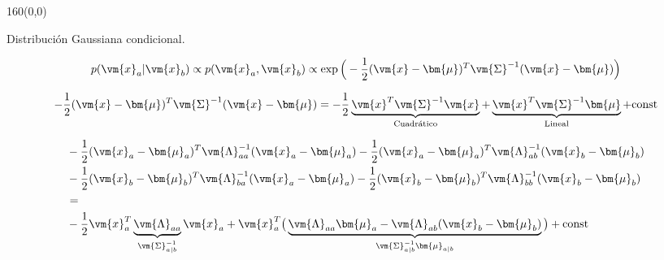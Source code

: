 \documentclass[shownotes,aspectratio=169]{beamer}
\begin{document}
\begin{frame}[plain]
 \begin{textblock}{160}(0,0)
\begin{center}
 \Large Distribuci\'on Gaussiana condicional.
\end{center}
\end{textblock}
\vspace{0.75cm}

\begin{align*}
 p(\vm{x}_a|\vm{x}_b) \propto p(\vm{x}_a,\vm{x}_b) \propto \exp\Big( -\frac{1}{2} (\vm{x}-\bm{\mu})^T \vm{\Sigma}^{-1} (\vm{x}-\bm{\mu}) \Big)
\end{align*}

\pause
\vspace{0.25cm}

\begin{align*}
-\frac{1}{2}(\vm{x}-\bm{\mu})^T \vm{\Sigma}^{-1} (\vm{x}-\bm{\mu}) = -\frac{1}{2} \underbrace{\vm{x}^T \vm{\Sigma}^{-1} \vm{x}}_{\text{Cuadr\'atico}} +  \underbrace{\vm{x}^T \vm{\Sigma}^{-1} \bm{\mu}}_{\text{Lineal}} + \text{const} 
\end{align*}

 
\pause
\vspace{0.25cm}

\begin{align*}
& -\frac{1}{2}(\vm{x}_a-\bm{\mu}_a)^T \vm{\Lambda}_{aa}^{-1} (\vm{x}_a-\bm{\mu}_a)
 -\frac{1}{2}(\vm{x}_a-\bm{\mu}_a)^T \vm{\Lambda}_{ab}^{-1} (\vm{x}_b-\bm{\mu}_b) \\
&  -\frac{1}{2}(\vm{x}_b-\bm{\mu}_b)^T \vm{\Lambda}_{ba}^{-1} (\vm{x}_a-\bm{\mu}_a)
-\frac{1}{2}(\vm{x}_b-\bm{\mu}_b)^T \vm{\Lambda}_{bb}^{-1} (\vm{x}_b-\bm{\mu}_b) \\
& = \\
& -\frac{1}{2} \vm{x}_a^T \underbrace{\vm{\Lambda}_{aa}}_{\vm{\Sigma}_{a|b}^{-1}} \vm{x}_a + \vm{x}_a^T \big( \underbrace{\vm{\Lambda}_{aa} \bm{\mu}_a  - \vm{\Lambda}_{ab}(\vm{x}_b-\bm{\mu}_b)}_{\vm{\Sigma}_{a|b}^{-1}\bm{\mu}_{a|b}} \big) + \text{const}
\end{align*}
\end{frame}
\end{document}
